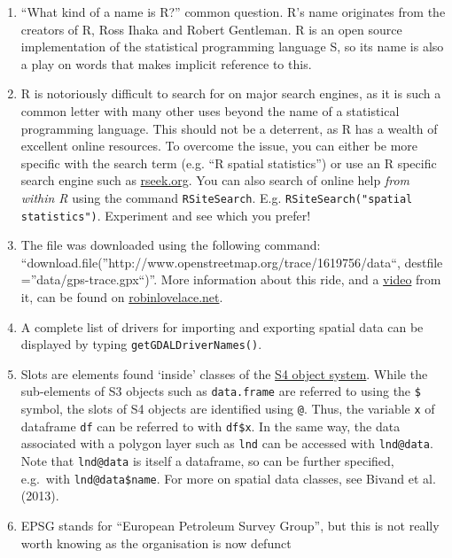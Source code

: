 \documentclass[]{article}
\begin{document}
\begin{enumerate}[1.]
\item
  ``What kind of a name is R?'' common question. R's name originates
  from the creators of R, Ross Ihaka and Robert Gentleman. R is an open
  source implementation of the statistical programming language S, so
  its name is also a play on words that makes implicit reference to
  this.
\item
  R is notoriously difficult to search for on major search engines, as
  it is such a common letter with many other uses beyond the name of a
  statistical programming language. This should not be a deterrent, as R
  has a wealth of excellent online resources. To overcome the issue, you
  can either be more specific with the search term (e.g. ``R spatial
  statistics'') or use an R specific search engine such as
  \href{http://www.rseek.org/}{rseek.org}. You can also search of online
  help \emph{from within R} using the command \texttt{RSiteSearch}. E.g.
  \texttt{RSiteSearch("spatial statistics")}. Experiment and see which
  you prefer!
\item
  The file was downloaded using the following command:
  ``download.file(''http://www.openstreetmap.org/trace/1619756/data``,
  destfile =''data/gps-trace.gpx``)''. More information about this ride,
  and a
  \href{http://www.youtube.com/watch?v=6a8QLiC4LV8\&feature=share}{video}
  from it, can be found on
  \href{http://robinlovelace.net/ecotech/2013/10/13/bicycle-trailer-move.html}{robinlovelace.net}.
\item
  A complete list of drivers for importing and exporting spatial data
  can be displayed by typing \texttt{getGDALDriverNames()}.
\item
  Slots are elements found `inside' classes of the
  \href{http://adv-r.had.co.nz/S4.html}{S4 object system}. While the
  sub-elements of S3 objects such as \texttt{data.frame} are referred to
  using the \texttt{\$} symbol, the slots of S4 objects are identified
  using \texttt{@}. Thus, the variable \texttt{x} of dataframe
  \texttt{df} can be referred to with \texttt{df\$x}. In the same way,
  the data associated with a polygon layer such as \texttt{lnd} can be
  accessed with \texttt{lnd@data}. Note that \texttt{lnd@data} is itself
  a dataframe, so can be further specified, e.g.~with
  \texttt{lnd@data\$name}. For more on spatial data classes, see Bivand
  et al. (2013).
\item
  EPSG stands for ``European Petroleum Survey Group'', but this is not
  really worth knowing as the organisation is now defunct

\end{enumerate}
\end{document}
